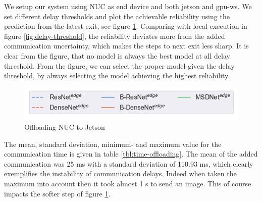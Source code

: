 We setup our system using NUC as end device and both \gls{jetson} and \gls{gpu-ws}. We set different delay thresholds and plot the achievable reliability using the prediction from the latest exit, see figure \ref{fig:practical-offloading}. Comparing with local execution in figure \ref{fig:delay-threshold}, the reliability deviates more from the added communication uncertainty, which makes the steps to next exit less sharp. It is clear from the figure, that no model is always the best model at all delay threshold. From the figure, we can select the proper model given the delay threshold, by always selecting the model achieving the highest reliability.
\begin{figure}
	\captionsetup[subfigure]{justification=centering,farskip=1pt,captionskip=1pt}
	\centering
	\includegraphics[width=.5\linewidth]{figures/edge/offloading_legend}
	\hfill
	\caption[Offloading NUC to Jetson]{Offloading NUC to Jetson}
	\label{fig:practical-offloading}
\end{figure}

The mean, standard deviation, minimum- and maximum value for the communication time is given in table \ref{tbl:time-offloading}. The mean of the added communication was 25 ms with a standard deviation of 110.93 ms, which clearly exemplifies the instability of communication delays. Indeed when taken the maximum into account then it took almost 1 s to send an image. This of course impacts the softer step of figure \ref{fig:practical-offloading}.

